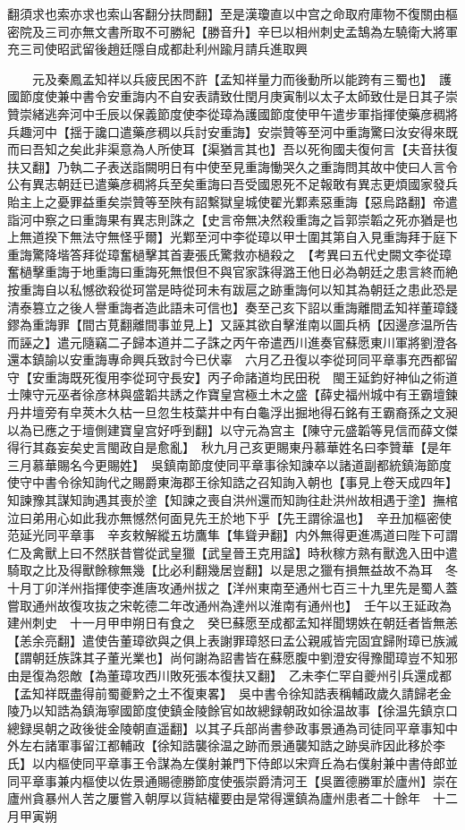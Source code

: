 翻須求也索亦求也索山客翻分扶問翻】至是漢瓊直以中宫之命取府庫物不復關由樞密院及三司亦無文書所取不可勝紀【勝音升】辛巳以相州刺史孟鵠為左驍衛大將軍充三司使昭武留後趙廷隱自成都赴利州踰月請兵進取興

　　元及秦鳳孟知祥以兵疲民困不許【孟知祥量力而後動所以能跨有三蜀也】　護國節度使兼中書令安重誨内不自安表請致仕閏月庚寅制以太子太師致仕是日其子崇贊崇緒逃奔河中壬辰以保義節度使李從璋為護國節度使甲午遣步軍指揮使藥彦稠將兵趣河中【揺于讒口遣藥彦稠以兵討安重誨】安崇贊等至河中重誨驚曰汝安得來既而曰吾知之矣此非渠意為人所使耳【渠猶言其也】吾以死徇國夫復何言【夫音扶復扶又翻】乃執二子表送詣闕明日有中使至見重誨慟哭久之重誨問其故中使曰人言令公有異志朝廷已遣藥彦稠將兵至矣重誨曰吾受國恩死不足報敢有異志更煩國家發兵貽主上之憂罪益重矣崇贊等至陜有詔繫獄皇城使翟光鄴素惡重誨【惡烏路翻】帝遣詣河中察之曰重誨果有異志則誅之【史言帝無决然殺重誨之旨郭崇韜之死亦猶是也上無道揆下無法守無怪乎爾】光鄴至河中李從璋以甲士圍其第自入見重誨拜于庭下重誨驚降堦答拜從璋奮檛擊其首妻張氏驚救亦檛殺之　【考異曰五代史闕文李從璋奮檛擊重誨于地重誨曰重誨死無恨但不與官家誅得潞王他日必為朝廷之患言終而絶按重誨自以私憾欲殺從珂當是時從珂未有跋扈之跡重誨何以知其為朝廷之患此恐是清泰篡立之後人譽重誨者造此語未可信也】奏至己亥下詔以重誨離間孟知祥董璋錢鏐為重誨罪【間古莧翻離間事並見上】又誣其欲自擊淮南以圖兵柄【因邊彦温所告而誣之】遣元隨竊二子歸本道并二子誅之丙午帝遣西川進奏官蘇愿東川軍將劉澄各還本鎮諭以安重誨專命興兵致討今已伏辜　六月乙丑復以李從珂同平章事充西都留守【安重誨既死復用李從珂守長安】丙子命諸道均民田税　閩王延鈞好神仙之術道士陳守元巫者徐彦林與盛韜共誘之作寶皇宫極土木之盛【薛史福州城中有王霸壇鍊丹井壇旁有皁莢木久枯一旦忽生枝葉井中有白龜浮出掘地得石銘有王霸裔孫之文昶以為已應之于壇側建寶皇宫好呼到翻】以守元為宫主【陳守元盛韜等見信而薛文傑得行其姦妄矣史言閩政自是愈亂】　秋九月己亥更賜東丹慕華姓名曰李贊華【是年三月慕華賜名今更賜姓】　吳鎮南節度使同平章事徐知諫卒以諸道副都統鎮海節度使守中書令徐知詢代之賜爵東海郡王徐知誥之召知詢入朝也【事見上卷天成四年】知諫豫其謀知詢遇其喪於塗【知諫之喪自洪州還而知詢往赴洪州故相遇于塗】撫棺泣曰弟用心如此我亦無憾然何面見先王於地下乎【先王謂徐温也】　辛丑加樞密使范延光同平章事　辛亥敕解縱五坊鷹隼【隼聳尹翻】内外無得更進馮道曰陛下可謂仁及禽獸上曰不然朕昔嘗從武皇獵【武皇晉王克用諡】時秋稼方熟有獸逸入田中遣騎取之比及得獸餘稼無幾【比必利翻幾居豈翻】以是思之獵有損無益故不為耳　冬十月丁卯洋州指揮使李進唐攻通州拔之【洋州東南至通州七百三十九里先是蜀人蓋嘗取通州故復攻抜之宋乾德二年改通州為達州以淮南有通州也】　壬午以王延政為建州刺史　十一月甲申朔日有食之　癸巳蘇愿至成都孟知祥聞甥妷在朝廷者皆無恙【恙余亮翻】遣使告董璋欲與之俱上表謝罪璋怒曰孟公親戚皆完固宜歸附璋已族滅【謂朝廷族誅其子董光業也】尚何謝為詔書皆在蘇愿腹中劉澄安得豫聞璋豈不知邪由是復為怨敵【為董璋攻西川敗死張本復扶又翻】　乙未李仁罕自夔州引兵還成都【孟知祥既盡得前蜀夔黔之土不復東畧】　吳中書令徐知誥表稱輔政歲久請歸老金陵乃以知誥為鎮海寧國節度使鎮金陵餘官如故總録朝政如徐温故事【徐温先鎮京口總録吳朝之政後徙金陵朝直遥翻】以其子兵部尚書參政事景通為司徒同平章事知中外左右諸軍事留江都輔政【徐知誥襲徐温之跡而景通襲知誥之跡吳祚因此移於李氏】以内樞使同平章事王令謀為左僕射兼門下侍郎以宋齊丘為右僕射兼中書侍郎並同平章事兼内樞使以佐景通賜德勝節度使張崇爵清河王【吳置德勝軍於廬州】崇在廬州貪暴州人苦之屢嘗入朝厚以貨結權要由是常得還鎮為廬州患者二十餘年　十二月甲寅朔
